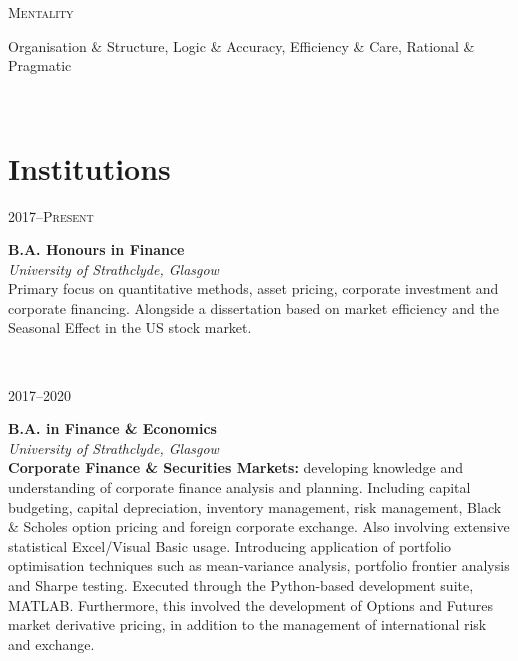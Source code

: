 \documentclass[a4, 10pt]{article}
\begin{document}
{\begin{minipage}[t]{.15\linewidth}
        \hfill                    
	\textsc{Mentality}
\end{minipage}                                        
\hfill\vline\hfill                                   
\begin{minipage}[t]{.80\linewidth}                   	
	Organisation \& Structure, Logic \& Accuracy, Efficiency \& Care, Rational \& Pragmatic
\end{minipage}\\                                                                      


\section{Institutions}

\begin{minipage}[t]{.15\linewidth}
	\hfill 
	\textsc{2017--Present}
\end{minipage}
\hfill\vline\hfill
\begin{minipage}[t]{.80\linewidth}
	\textbf{B.A. Honours in Finance}\\
	\textit{University of Strathclyde, Glasgow}\\ 
	Primary focus on quantitative methods, asset pricing, corporate investment and corporate financing. Alongside a dissertation based on market efficiency and the Seasonal Effect in the US stock market.
\end{minipage}\\

\begin{minipage}[t]{.15\linewidth}
        \hfill 
        \textsc{2017--2020}
\end{minipage}
\hfill\vline\hfill
\begin{minipage}[t]{.80\linewidth}
	\textbf{B.A. in Finance \& Economics}\\
        \textit{University of Strathclyde, Glasgow}\\ 
	\textbf{Corporate Finance \& Securities Markets:} developing knowledge and understanding of corporate finance analysis and planning. Including capital budgeting, capital depreciation, inventory management, risk management, Black \& Scholes option pricing and foreign corporate exchange. Also involving extensive statistical Excel/Visual Basic usage. Introducing application of portfolio optimisation techniques such as mean-variance analysis, portfolio frontier analysis and Sharpe testing. Executed through the Python-based development suite, MATLAB. Furthermore, this involved the development of Options and Futures market derivative pricing, in addition to the management of international risk and exchange.
\end{minipage}\\
\vspace{0.25cm}

}
\end{document}

